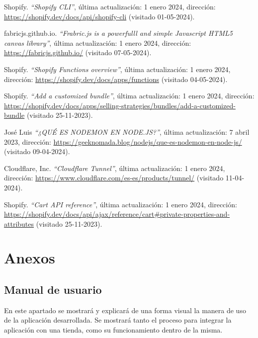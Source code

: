 \documentclass[11pt]{article}
\begin{document}
\begin{thebibliography}{100}
    Shopify.
    \textit{``Shopify CLI''}, última actualización: 1 enero 2024, dirección: \url{https://shopify.dev/docs/api/shopify-cli} (visitado 01-05-2024).

    fabricjs.github.io.
    \textit{``Frabric.js is a powerfulll and simple Javascript HTML5 canvas library''}, última actualización: 1 enero 2024, dirección: \url{https://fabricjs.github.io/} (visitado 07-05-2024).

    Shopify.
    \textit{``Shopify Functions overview''}, última actualización: 1 enero 2024, dirección: \url{https://shopify.dev/docs/apps/functions} (visitado 04-05-2024).

    Shopify.
    \textit{``Add a customized bundle''}, última actualización: 1 enero 2024, dirección: \url{https://shopify.dev/docs/apps/selling-strategies/bundles/add-a-customized-bundle} (visitado 25-11-2023).

    José Luis
    \textit{``¿QUÉ ES NODEMON EN NODE.JS?''}, última actualización: 7 abril 2023, dirección: \url{https://geeknomada.blog/nodejs/que-es-nodemon-en-node-js/} (visitado 09-04-2024).

    Cloudflare, Inc.
    \textit{``Cloudflare Tunnel''}, última actualización: 1 enero 2024, dirección: \url{https://www.cloudflare.com/es-es/products/tunnel/} (visitado 11-04-2024).

    Shopify.
    \textit{``Cart API reference''}, última actualización: 1 enero 2024, dirección: \url{https://shopify.dev/docs/api/ajax/reference/cart#private-properties-and-attributes} (visitado 25-11-2023).

\end{thebibliography}

\clearpage
\section{Anexos}

\subsection{Manual de usuario}\label{sec:manual}
En este apartado se mostrará y explicará de una forma visual la manera de uso de la aplicación desarrollada. Se mostrará tanto el proceso para integrar la aplicación con una tienda, como
su funcionamiento dentro de la misma.
\end{document}
